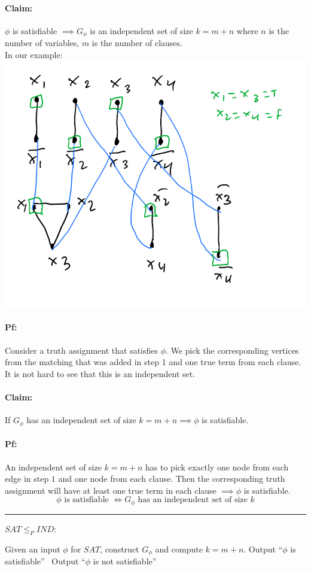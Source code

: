 \documentclass[12 pt]{article}
\begin{document}
          \paragraph{Claim:} $\phi$ is satisfiable $\implies G_{\phi}$
          is an independent set of size $k=m+n$ where $n$ is the number
          of variables, $m$ is the number of clauses.
          \\ In our example:
          \\ \includegraphics[width=.9\textwidth]{i129.pdf}
          \paragraph{Pf:} Consider a truth assignment that satisfies
          $\phi$. We pick the corresponding vertices from the matching
          that was added in step 1 and one true term from each
          clause. It is not hard to see that this is an independent set.
          
          \paragraph{Claim:} If $G_{\phi}$ has an independent set of
          size $k=m+n \implies \phi$ is satisfiable.
          \paragraph{Pf:} An independent set of size $k=m+n$ has to
          pick exactly one node from each edge in step $1$ and one
          node from each clause. Then the corresponding truth
          assignment will have at least one true term in each clause
          $\implies \phi$ is satisfiable.
          $$\phi \text{ is satisfiable }\iff G_{\phi} \text{ has an
            independent set of size }k$$
          \noindent \rule{\textwidth}{0.5pt}
          $SAT \leq_P IND:$
          \begin{algorithmic}
            \State Given an input $\phi$ for $SAT$, construct
            $G_{\phi}$ and compute $k=m+n$.
            Output ``$\phi$ is satisfiable''
            \Else \ Output ``$\phi$ is not satisfiable''
            \EndIf
          \end{algorithmic}
\end{document}
